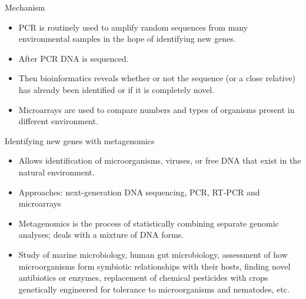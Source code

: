 \documentclass[
  ignorenonframetext,
  aspectratio=169]{beamer}
\providecommand{\tightlist}{%
  \setlength{\itemsep}{0pt}\setlength{\parskip}{0pt}}
\begin{document}
\begin{frame}{Mechanism}
\protect\hypertarget{mechanism}{}
\begin{itemize}
\tightlist
\item
  PCR is routinely used to amplify random sequences from many
  environmental samples in the hope of identifying new genes.
\item
  After PCR DNA is sequenced.
\item
  Then bioinformatics reveals whether or not the sequence (or a close
  relative) has already been identified or if it is completely novel.
\item
  Microarrays are used to compare numbers and types of organisms present
  in different environment.
\end{itemize}
\end{frame}

\begin{frame}{Identifying new genes with metagenomics}
\protect\hypertarget{identifying-new-genes-with-metagenomics}{}
\begin{itemize}
\tightlist
\item
  Allows identification of microorganisms, viruses, or free DNA that
  exist in the natural environment.
\item
  Approaches: next-generation DNA sequencing, PCR, RT-PCR and
  microarrays
\item
  Metagenomics is the process of statistically combining separate
  genomic analyses; deals with a mixture of DNA forms.
\item
  Study of marine microbiology, human gut microbiology, assessment of
  how microorganisms form symbiotic relationships with their hosts,
  finding novel antibiotics or enzymes, replacement of chemical
  pesticides with crops genetically engineered for tolerance to
  microorganisms and nematodes, etc.
\end{itemize}
\end{frame}
\end{document}
